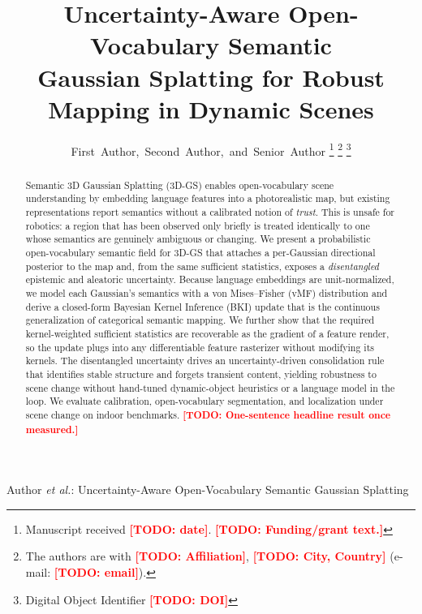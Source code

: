 \documentclass[journal]{IEEEtran}
\newcommand{\todo}[1]{\textcolor{red}{\textbf{[TODO: #1]}}}
\begin{document}
\title{Uncertainty-Aware Open-Vocabulary Semantic\\
Gaussian Splatting for Robust Mapping in Dynamic Scenes}

\author{First~Author,~Second~Author,~and~Senior~Author%
\thanks{Manuscript received \todo{date}. \todo{Funding/grant text.}}%
\thanks{The authors are with \todo{Affiliation}, \todo{City, Country}
(e-mail: \todo{email}).}%
\thanks{Digital Object Identifier \todo{DOI}}}

%
{Author \MakeLowercase{\textit{et al.}}: Uncertainty-Aware Open-Vocabulary Semantic Gaussian Splatting}

\maketitle

\begin{abstract}
Semantic 3D Gaussian Splatting (3D-GS) enables open-vocabulary scene
understanding by embedding language features into a photorealistic map, but
existing representations report semantics without a calibrated notion of
\emph{trust}. This is unsafe for robotics: a region that has been observed only
briefly is treated identically to one whose semantics are genuinely ambiguous or
changing. We present a probabilistic open-vocabulary semantic field for 3D-GS
that attaches a per-Gaussian directional posterior to the map and, from the same
sufficient statistics, exposes a \emph{disentangled} epistemic and aleatoric
uncertainty. Because language embeddings are unit-normalized, we model each
Gaussian's semantics with a von Mises--Fisher (vMF) distribution and derive a
closed-form Bayesian Kernel Inference (BKI) update that is the continuous
generalization of categorical semantic mapping. We further show that the
required kernel-weighted sufficient statistics are recoverable as the gradient
of a feature render, so the update plugs into any differentiable feature
rasterizer without modifying its kernels. The disentangled uncertainty drives an
uncertainty-driven consolidation rule that identifies stable structure and
forgets transient content, yielding robustness to scene change without
hand-tuned dynamic-object heuristics or a language model in the loop. We
evaluate calibration, open-vocabulary segmentation, and localization under scene
change on indoor benchmarks. \todo{One-sentence headline result once measured.}
\end{abstract}
\end{document}
